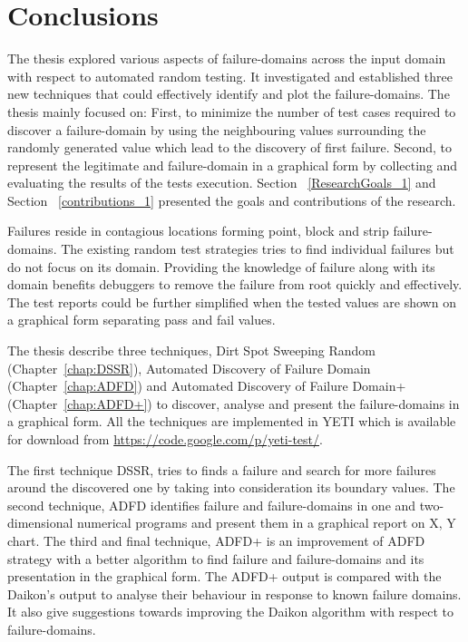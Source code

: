 
\chapter{Conclusions}
\label{chap:conclusions}



The thesis explored various aspects of failure-domains across the input domain with respect to automated random testing. It investigated and established three new techniques that could effectively identify and plot the failure-domains. The thesis mainly focused on: First, to minimize the number of test cases required to discover a failure-domain by using the neighbouring values surrounding the randomly generated value which lead to the discovery of first failure. Second, to represent the legitimate and failure-domain in a graphical form by collecting and evaluating the results of the tests execution. Section ~\ref{ResearchGoals_1} and Section ~\ref{contributions_1} presented the goals and contributions of the research.


Failures reside in contagious locations forming point, block and strip failure-domains. The existing random test strategies tries to find individual failures but do not focus on its domain. Providing the knowledge of failure along with its domain benefits debuggers to remove the failure from root quickly and effectively. The test reports could be further simplified when the tested values are shown on a graphical form separating pass and fail values. 

The thesis describe three techniques, Dirt Spot Sweeping Random (Chapter~\ref{chap:DSSR}), Automated Discovery of Failure Domain (Chapter~\ref{chap:ADFD}) and Automated Discovery of Failure Domain+ (Chapter~\ref{chap:ADFD+}) to discover, analyse and present the failure-domains in a graphical form. All the techniques are implemented in YETI which is available for download from \url{https://code.google.com/p/yeti-test/}.

The first technique DSSR, tries to finds a failure and search for more failures around the discovered one by taking into consideration its boundary values. The second technique, ADFD identifies failure and failure-domains in one and two-dimensional numerical programs and present them in a graphical report on X, Y chart. The third and final technique, ADFD+ is an improvement of ADFD strategy with a better algorithm to find failure and failure-domains and its presentation in the graphical form. The ADFD+ output is compared with the Daikon's output to analyse their behaviour in response to known failure domains. It also give suggestions towards improving the Daikon algorithm with respect to failure-domains.




